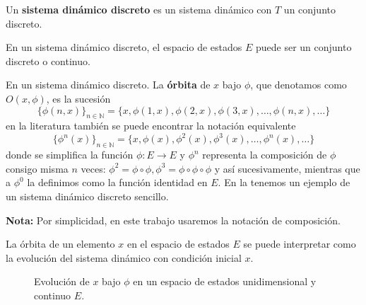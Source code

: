 \documentclass[../Main.tex]{subfiles}
\begin{document}
\begin{definition}
\label{}
    Un \textbf{sistema dinámico discreto} es un sistema dinámico con $T$ un conjunto discreto. 
\end{definition}
\begin{remark}
\label{}
En un sistema dinámico discreto, el espacio de estados $E$ puede ser un conjunto discreto o continuo.
\end{remark}
\begin{definition}
\label{}
    En un sistema dinámico discreto. La \textbf{órbita} de $x$ bajo $\phi$, que denotamos como $O(x,\phi)$, es la sucesión \[\{\phi(n,x)\}_{n\in\mathbb{N}}=\{x,\phi(1,x),\phi(2,x),\phi(3,x),\dots,\phi(n,x),\dots\}\]
en la literatura también se puede encontrar la notación equivalente
    \[\{\phi^n(x)\}_{n\in\mathbb{N}}=\{x,\phi(x),\phi^2(x),\phi^3(x),\dots,\phi^n(x),\dots\}\]
    donde se simplifica la función $\phi : E\rightarrow E$ y $\phi^n$ representa la composición de $\phi$ consigo misma $n$ veces: $\phi^2=\phi\circ \phi, \phi^3=\phi\circ \phi\circ \phi$ y así sucesivamente, mientras que a $\phi^0$ la definimos como la función identidad en $E$. En la  tenemos un ejemplo de un sistema dinámico discreto sencillo. 
    
    \textbf{Nota:} Por simplicidad, en este trabajo usaremos la notación de composición.
\end{definition}


La órbita de un elemento $x$ en el espacio de estados $E$ se puede interpretar como la evolución del sistema dinámico con condición inicial $x$.

\begin{figure}[h!]
    \centering
    \caption{Evolución de $x$ bajo $\phi$ en un espacio de estados unidimensional y continuo $E$.}
    \label{Sdd}
\end{figure}

\end{document}
